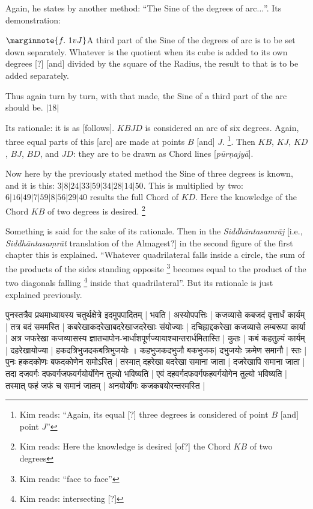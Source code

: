 \documentclass[12pt]{book}
\let\*=\d
\def\purnajya{\textit{p\=ur\*najy\=a}}
\def\elp{$\ldots$}
\def\danda{$|$}
\begin{document}
\newpage


Again, he states by another method: ``The Sine of the degrees of arc\elp''. Its demonstration:

$\marginnote{f.~1v J}$A third part of the Sine of the degrees of arc is to be set down separately. Whatever
is the quotient when its cube
is added to its own degrees [?] [and] divided by the square of the Radius, the result
to  that is to be added separately. 

Thus again turn by turn, with that made, the Sine of a third part of the arc should be. \danda18\danda

Its rationale: it is as [follows]. $KBJD$ is considered an arc of six degrees. 
Again, three equal parts of this [arc] are made at points $B$ [and] $J$. \footnote{Kim reads: ``Again, its equal [?] three degrees is considered of point $B$ [and] point $J$''}.
Then $KB$, $KJ$, $KD$, $BJ$, $BD$, and $JD$: they are to be drawn as
Chord lines [\purnajya]. 

Now here by the previously stated method the Sine of three degrees is known, 
and it is this:  $3|8|24|33|59|34|28|14|50$. This is multiplied by two:
$6|16|49|7|59|8|56|29|40$ results the full Chord of $KD$. Here the knowledge
of the Chord $KB$ of two degrees is desired. \footnote{Kim reads: Here the knowledge is desired [of?] the Chord $KB$ of two degrees}

Something is said for the sake of its rationale. Then  in the 
\textit{Siddh\=anta\-samr\=aj} [i.e., \textit{Siddh\=antasa\*mr\=at} translation
of the Almagest?] in the second figure of the first chapter this is
explained.  ``Whatever quadrilateral falls inside a circle, the sum of the 
products of the sides standing opposite \footnote{Kim reads: ``face to face''} becomes equal to the
product of the two diagonals falling \footnote{Kim reads: intersecting [?]} inside that quadrilateral''.
But its rationale is just explained previously. 

\newpage 


{\s पुनस्तत्रैव प्रथ\-माध्यायस्य चतुर्थक्षेत्रे इदमुपपादितम् |
%
{
} 
 भवति |
अस्योपपत्तिः |
कजव्यासे कबजदं वृत्तार्धं कार्यम् |
तत्र बदं 
सममस्ति |
कबरेखाकदरेखा\-बदरेखा\-जदरेखाः संयोज्याः |
दचिह्नाद्दकरेखा कजव्यासे लम्बरूपा कार्या |
अत्र जफरेखा कजव्यासस्य ज्ञातचापोन-भार्धांशपूर्णज्यायाश्चान्तरार्धमितास्ति |
कुतः |
कबं कहतुल्यं कार्यम् |
दहरेखायोज्या |
हकदत्रिभुज\-दकबत्रिभुजयोः ।
कहभुजकदभुजौ बकभुजक$|$%
दभुजयोः
क्रमेण समानौ | स्तः | पुनः हकदकोणः बफदकोणेन समोऽस्ति | तस्मात् दहरेखा बदरेखा समाना जाता | दजरेखापि समाना जाता | तदा दजवर्गः दफवर्गजफवर्गयोर्योगेन तुल्यो भविष्यति |
एवं दहवर्गदफवर्गफहवर्गयोगेन तुल्यो भविष्यति |
तस्मात् फहं जफं च समानं जातम् | अनयोर्योगः कजकबयोरन्तरमस्ति |} \\
\end{document}
